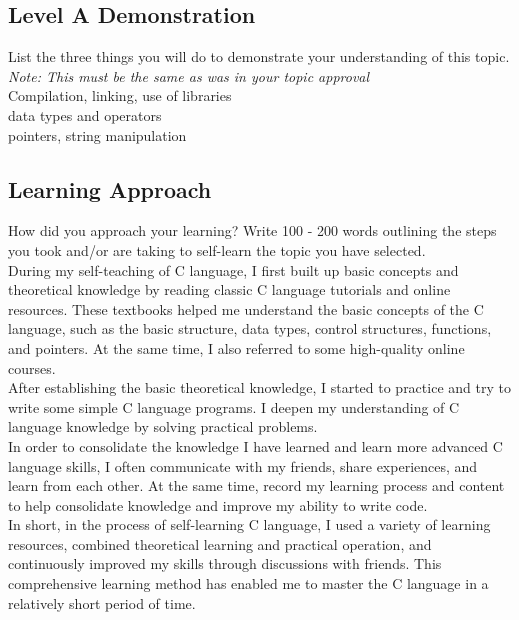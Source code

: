 \documentclass[a4paper, 11pt]{report}
\begin{document}
\subsection{Level A Demonstration}
List the three things you will do to demonstrate your understanding of this topic.
\textit{Note: This must be the same as was in your topic approval}\\

Compilation, linking, use of libraries\\

data types and operators\\

pointers, string manipulation\\

\subsection{Learning Approach}
How did you approach your learning? Write 100 - 200 words outlining the steps you took and/or are taking to self-learn the topic you have selected.\\

During my self-teaching of C language, I first built up basic concepts and theoretical knowledge by reading classic C language tutorials and online resources. These textbooks helped me understand the basic concepts of the C language, such as the basic structure, data types, control structures, functions, and pointers. At the same time, I also referred to some high-quality online courses.\\

After establishing the basic theoretical knowledge, I started to practice and try to write some simple C language programs. I deepen my understanding of C language knowledge by solving practical problems.\\

In order to consolidate the knowledge I have learned and learn more advanced C language skills, I often communicate with my friends, share experiences, and learn from each other. At the same time, record my learning process and content to help consolidate knowledge and improve my ability to write code.\\

In short, in the process of self-learning C language, I used a variety of learning resources, combined theoretical learning and practical operation, and continuously improved my skills through discussions with friends. This comprehensive learning method has enabled me to master the C language in a relatively short period of time.\\
\end{document}
